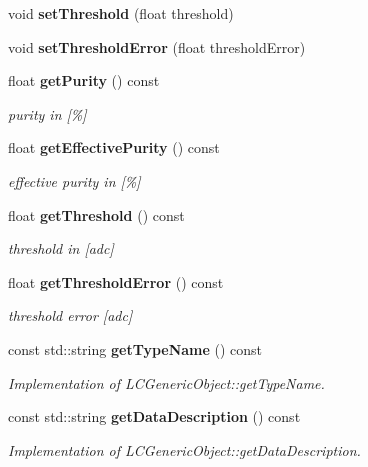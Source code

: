 \begin{DoxyCompactItemize}
\item 
void {\bfseries setThreshold} (float threshold)\label{classCALICE_1_1VetoThreshold_a09678e0ab3ff1350865f63a337092600}

\item 
void {\bfseries setThresholdError} (float thresholdError)\label{classCALICE_1_1VetoThreshold_ae3fca9234b325c9f4a981402c4e3b07a}

\item 
float {\bf getPurity} () const \label{classCALICE_1_1VetoThreshold_a53c8bbcfa151ff8466aae71800437ee6}

\begin{DoxyCompactList}\small\item\em purity in [\%] \item\end{DoxyCompactList}\item 
float {\bf getEffectivePurity} () const \label{classCALICE_1_1VetoThreshold_a379e4dffb8315d795c4b32935565afb9}

\begin{DoxyCompactList}\small\item\em effective purity in [\%] \item\end{DoxyCompactList}\item 
float {\bf getThreshold} () const \label{classCALICE_1_1VetoThreshold_a2dc83dbcf8b8f9cf35773876e1d3f44d}

\begin{DoxyCompactList}\small\item\em threshold in [adc] \item\end{DoxyCompactList}\item 
float {\bf getThresholdError} () const \label{classCALICE_1_1VetoThreshold_aab2390cd17bd58fd9817f28f7c4c7546}

\begin{DoxyCompactList}\small\item\em threshold error [adc] \item\end{DoxyCompactList}\item 
const std::string {\bf getTypeName} () const \label{classCALICE_1_1VetoThreshold_a9b4556a5735ef0b698000511f19a79d5}

\begin{DoxyCompactList}\small\item\em Implementation of LCGenericObject::getTypeName. \item\end{DoxyCompactList}\item 
const std::string {\bf getDataDescription} () const \label{classCALICE_1_1VetoThreshold_aae0d1f793fa674889e63fd43ba62e5df}

\begin{DoxyCompactList}\small\item\em Implementation of LCGenericObject::getDataDescription. \item\end{DoxyCompactList}\end{DoxyCompactItemize}


